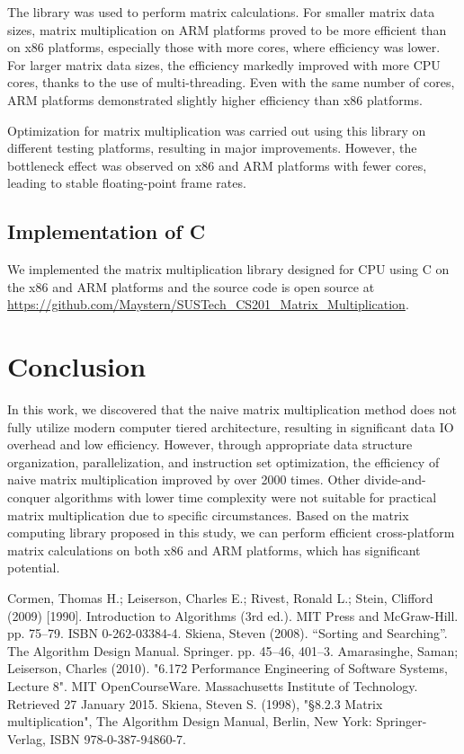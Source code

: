 \documentclass[conference]{IEEEtran}
\begin{document}
	The library was used to perform matrix calculations. For smaller matrix data sizes, matrix multiplication on ARM platforms proved to be more efficient than on x86 platforms, especially those with more cores, where efficiency was lower. For larger matrix data sizes, the efficiency markedly improved with more CPU cores, thanks to the use of multi-threading. Even with the same number of cores, ARM platforms demonstrated slightly higher efficiency than x86 platforms.
	
	Optimization for matrix multiplication was carried out using this library on different testing platforms, resulting in major improvements. However, the bottleneck effect was observed on x86 and ARM platforms with fewer cores, leading to stable floating-point frame rates.
	
	\subsection{Implementation of C}
		We implemented the matrix multiplication library designed for CPU using C on the x86 and ARM platforms and the source code is open source at \url{https://github.com/Maystern/SUSTech_CS201_Matrix_Multiplication}.
	
	\section{Conclusion}
	
	In this work, we discovered that the naive matrix multiplication method does not fully utilize modern computer tiered architecture, resulting in significant data IO overhead and low efficiency. However, through appropriate data structure organization, parallelization, and instruction set optimization, the efficiency of naive matrix multiplication improved by over 2000 times. Other divide-and-conquer algorithms with lower time complexity were not suitable for practical matrix multiplication due to specific circumstances. Based on the matrix computing library proposed in this study, we can perform efficient cross-platform matrix calculations on both x86 and ARM platforms, which has significant potential.
	
	\begin{thebibliography}{00}
		 Cormen, Thomas H.; Leiserson, Charles E.; Rivest, Ronald L.; Stein, Clifford (2009) [1990]. Introduction to Algorithms (3rd ed.). MIT Press and McGraw-Hill. pp. 75–79. ISBN 0-262-03384-4.
		  Skiena, Steven (2008). ``Sorting and Searching''. The Algorithm Design Manual. Springer. pp. 45–46, 401–3.
		 Amarasinghe, Saman; Leiserson, Charles (2010). "6.172 Performance Engineering of Software Systems, Lecture 8". MIT OpenCourseWare. Massachusetts Institute of Technology. Retrieved 27 January 2015.
		 Skiena, Steven S. (1998), "§8.2.3 Matrix multiplication", The Algorithm Design Manual, Berlin, New York: Springer-Verlag, ISBN 978-0-387-94860-7.
	\end{thebibliography}
\end{document}

